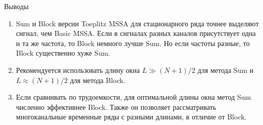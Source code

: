 \documentclass[ucs, notheorems, handout]{beamer}
\newcounter{saveenumi}
\newcommand{\seti}{\setcounter{saveenumi}{\value{enumi}}}
\newcommand{\conti}{\setcounter{enumi}{\value{saveenumi}}}
\begin{document}
\begin{frame}{Выводы}
	\begin{enumerate}
		\item Sum и Block версии Toeplitz MSSA для стационарного ряда точнее выделяют сигнал, чем Basic MSSA. Если в сигналах разных каналов присутствует одна и та же частота, то Block немного лучше Sum. Но если частоты разные, то Block существенно хуже Sum.\medskip
		\item Рекомендуется использовать длину окна $L\gg(N+1)/2$ для метода Sum и $L\approx (N+1)/2$ для метода Block.\medskip
		\item Если сравнивать по трудоемкости, для оптимальной длины окна метод Sum численно эффективнее Block. Также он позволяет рассматривать многоканальные временные ряды с разными длинами, в отличие от Block.
		\seti
	\end{enumerate}
\end{frame}
\end{document}
